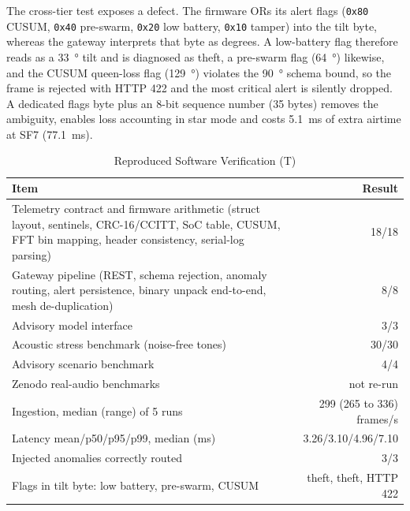 \documentclass[conference]{IEEEtran}
\newcommand{\evT}{\textsf{T}}  %
\begin{document}
The cross-tier test exposes a defect. The firmware ORs its alert flags (\texttt{0x80} CUSUM, \texttt{0x40} pre-swarm, \texttt{0x20} low battery, \texttt{0x10} tamper) into the tilt byte, whereas the gateway interprets that byte as degrees. A low-battery flag therefore reads as a \SI{33}{\degree} tilt and is diagnosed as theft, a pre-swarm flag (\SI{64}{\degree}) likewise, and the CUSUM queen-loss flag (\SI{129}{\degree}) violates the \SI{90}{\degree} schema bound, so the frame is rejected with HTTP 422 and the most critical alert is silently dropped. A dedicated flags byte plus an 8-bit sequence number (35 bytes) removes the ambiguity, enables loss accounting in star mode and costs \SI{5.1}{ms} of extra airtime at SF7 (\SI{77.1}{ms}).

\begin{table}[!t]
\caption{Reproduced Software Verification (\evT)}
\label{tab:verif}
\centering
\footnotesize
\setlength{\tabcolsep}{4pt}
\begin{tabular}{@{}>{\raggedright\arraybackslash}p{4.75cm}r@{}}
\toprule
Item & Result\\
\midrule
Telemetry contract and firmware arithmetic (struct layout, sentinels, CRC-16/CCITT, SoC table, CUSUM, FFT bin mapping, header consistency, serial-log parsing) & 18/18\\
Gateway pipeline (REST, schema rejection, anomaly routing, alert persistence, binary unpack end-to-end, mesh de-duplication) & 8/8\\
Advisory model interface & 3/3\\
\midrule
Acoustic stress benchmark (noise-free tones) & 30/30\\
Advisory scenario benchmark & 4/4\\
Zenodo real-audio benchmarks & not re-run\\
\midrule
Ingestion, median (range) of 5 runs & 299 (265 to 336) frames/s\\
Latency mean/p50/p95/p99, median (ms) & 3.26/3.10/4.96/7.10\\
Injected anomalies correctly routed & 3/3\\
Flags in tilt byte: low battery, pre-swarm, CUSUM & theft, theft, HTTP 422\\
\bottomrule
\end{tabular}
\end{table}
\end{document}
